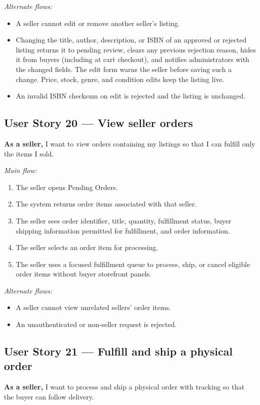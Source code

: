\documentclass[11pt]{scrreprt}
\begin{document}
\textit{Alternate flows:}
\begin{itemize}
\item A seller cannot edit or remove another seller's listing.
\item Changing the title, author, description, or ISBN of an approved or rejected
listing returns it to pending review, clears any previous rejection reason,
hides it from buyers (including at cart checkout), and notifies administrators
with the changed fields. The edit form warns the seller before saving such a
change.
Price, stock, genre, and condition edits keep the listing live.
\item An invalid ISBN checksum on edit is rejected and the listing is unchanged.
\end{itemize}

\subsection{User Story 20 --- View seller orders}
\textbf{As a seller,} I want to view orders containing my listings so that I
can fulfill only the items I sold.

\textit{Main flow:}
\begin{enumerate}
\item The seller opens Pending Orders.
\item The system returns order items associated with that seller.
\item The seller sees order identifier, title, quantity, fulfillment status,
buyer shipping information permitted for fulfillment, and order information.
\item The seller selects an order item for processing.
\item The seller uses a focused fulfillment queue to process, ship, or cancel
eligible order items without buyer storefront panels.
\end{enumerate}

\textit{Alternate flows:}
\begin{itemize}
\item A seller cannot view unrelated sellers' order items.
\item An unauthenticated or non-seller request is rejected.
\end{itemize}

\subsection{User Story 21 --- Fulfill and ship a physical order}
\textbf{As a seller,} I want to process and ship a physical order with tracking
so that the buyer can follow delivery.
\end{document}
